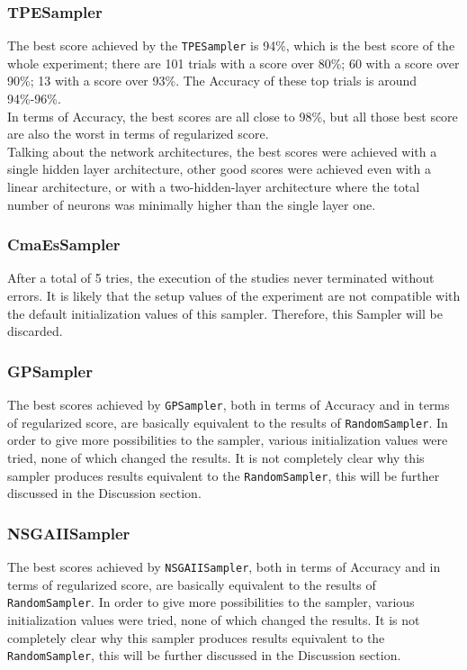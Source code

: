 \subsubsection{TPESampler}

The best score achieved by the \texttt{TPESampler} is 94\%, which is the best score of the whole experiment; there are 101 trials with a score over 80\%; 60 with a score over 90\%; 13 with a score over 93\%. The Accuracy of these top trials is around 94\%-96\%.
\\[0.3cm]In terms of Accuracy, the best scores are all close to 98\%, but all those best score are also the worst in terms of regularized score.
\\[0.3cm]Talking about the network architectures, the best scores were achieved with a single hidden layer architecture, other good scores were achieved even with a linear architecture, or with a two-hidden-layer architecture where the total number of neurons was minimally higher than the single layer one.

\subsubsection{CmaEsSampler}

After a total of 5 tries, the execution of the studies never terminated without errors.
It is likely that the setup values of the experiment are not compatible with the default initialization values of this sampler.
Therefore, this Sampler will be discarded.

\subsubsection{GPSampler}

The best scores achieved by \texttt{GPSampler}, both in terms of Accuracy and in terms of regularized score, are basically equivalent to the results of \texttt{RandomSampler}.
In order to give more possibilities to the sampler, various initialization values were tried, none of which changed the results.
It is not completely clear why this sampler produces results equivalent to the \texttt{RandomSampler}, this will be further discussed in the Discussion section.

\subsubsection{NSGAIISampler}

The best scores achieved by \texttt{NSGAIISampler}, both in terms of Accuracy and in terms of regularized score, are basically equivalent to the results of \texttt{RandomSampler}.
In order to give more possibilities to the sampler, various initialization values were tried, none of which changed the results.
It is not completely clear why this sampler produces results equivalent to the \texttt{RandomSampler}, this will be further discussed in the Discussion section.

